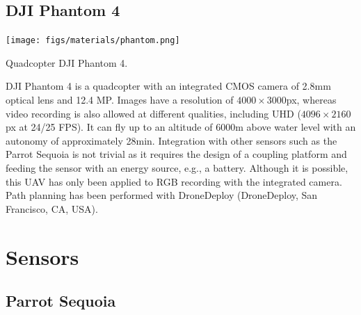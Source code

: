 \subsection{DJI Phantom 4}

\begin{marginfigure}[.1cm]
	\texttt{[image: figs/materials/phantom.png]}
	\caption{Quadcopter DJI Phantom 4.}
	\label{fig:dji_phantom4}
\end{marginfigure}
DJI Phantom 4 is a quadcopter with an integrated CMOS camera of 2.8\si{\milli\meter} optical lens and 12.4 MP. Images have a resolution of $4000 \times 3000$px, whereas video recording is also allowed at different qualities, including UHD ($4096 \times 2160$ px at 24/25 FPS). It can fly up to an altitude of 6000\si{\meter} above water level with an autonomy of approximately 28\si{\minute}. Integration with other sensors such as the Parrot Sequoia is not trivial as it requires the design of a coupling platform and feeding the sensor with an energy source, e.g., a battery. Although it is possible, this UAV has only been applied to RGB recording with the integrated camera. Path planning has been performed with DroneDeploy (DroneDeploy, San Francisco, CA, USA).

\section{Sensors}

\subsection{Parrot Sequoia}

